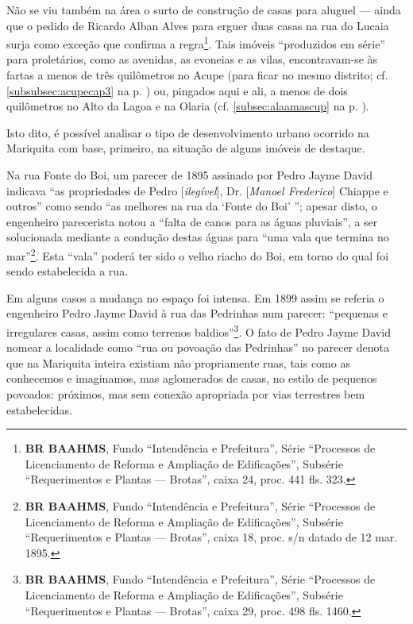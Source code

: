 Não se viu também na área o surto de construção de casas para aluguel --- ainda que o pedido de Ricardo Alban Alves para erguer duas casas na rua do Lucaia surja como exceção que confirma a regra\footnote{\textbf{BR BAAHMS}, Fundo ``Intendência e Prefeitura'', Série ``Processos de Licenciamento de Reforma e Ampliação de Edificações'', Subsérie ``Requerimentos e Plantas --- Brotas'', caixa 24, proc. 441 fls. 323.}. Tais imóveis ``produzidos em série'' para proletários, como as avenidas, as evoneias e as vilas, encontravam-se às fartas a menos de três quilômetros no Acupe (para ficar no mesmo distrito; cf. \autoref{subsubsec:acupecap3} na p. \pageref{subsubsec:acupecap3}) ou, pingados aqui e ali, a menos de dois quilômetros no Alto da Lagoa e na Olaria (cf. \autoref{subsec:alaamascup} na p. \pageref{subsec:alaamascup}). 


Isto dito, é possível analisar o tipo de desenvolvimento urbano ocorrido na Mariquita com base, primeiro, na situação de alguns imóveis de destaque.

Na rua Fonte do Boi, um parecer de 1895 assinado por Pedro Jayme David indicava ``as propriedades de Pedro [\textit{ilegível}], Dr. [\textit{Manoel Frederico}] Chiappe e outros'' como sendo ``as melhores na rua da `Fonte do Boi' ''; apesar disto, o engenheiro parecerista notou a ``falta de canos para as águas pluviais'', a ser solucionada mediante a condução destas águas para ``uma vala que termina no mar''\footnote{\textbf{BR BAAHMS}, Fundo ``Intendência e Prefeitura'', Série ``Processos de Licenciamento de Reforma e Ampliação de Edificações'', Subsérie ``Requerimentos e Plantas --- Brotas'', caixa 18, proc. s/n datado de 12 mar. 1895.}. Esta ``vala'' poderá ter sido o velho riacho do Boi, em torno do qual foi sendo estabelecida a rua.

Em alguns casos a mudança no espaço foi intensa. Em 1899 assim se referia o engenheiro Pedro Jayme David à rua das Pedrinhas num parecer: ``pequenas e irregulares casas, assim como terrenos baldios''\footnote{\textbf{BR BAAHMS}, Fundo ``Intendência e Prefeitura'', Série ``Processos de Licenciamento de Reforma e Ampliação de Edificações'', Subsérie ``Requerimentos e Plantas --- Brotas'', caixa 29, proc. 498 fls. 1460.}. O fato de Pedro Jayme David nomear a localidade como ``rua ou povoação das Pedrinhas'' no parecer denota que na Mariquita inteira existiam não propriamente ruas, tais como as conhecemos e imaginamos, mas aglomerados de casas, no estilo de pequenos povoados: próximos, mas sem conexão apropriada por vias terrestres bem estabelecidas.

